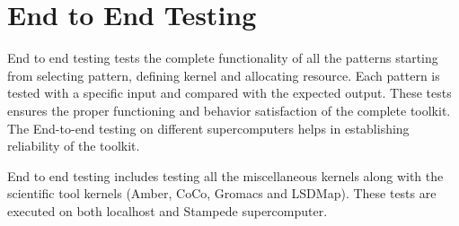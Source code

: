 \documentclass[10pt]{ruthesis}
\begin{document}
\section{End to End Testing}
End to end testing tests the complete functionality of all the patterns starting from selecting pattern, defining kernel and allocating resource. Each pattern is tested with a specific input and compared with the expected output. These tests ensures the proper functioning and behavior satisfaction of the complete toolkit. The End-to-end testing on different supercomputers helps in establishing reliability of the toolkit. 

End to end testing includes testing all the miscellaneous kernels along with the scientific tool kernels (Amber, CoCo, Gromacs and LSDMap). These tests are executed on both localhost and Stampede supercomputer.
\end{document}
